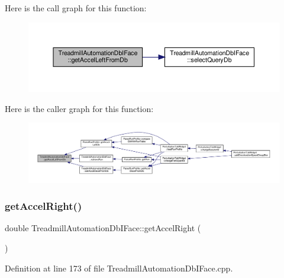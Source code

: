Here is the call graph for this function\+:
\nopagebreak
\begin{figure}[H]
\begin{center}
\leavevmode
\includegraphics[width=350pt]{class_treadmill_automation_db_i_face_a9d028cc3d56ffa0f9a08bcbb1a7a68b7_cgraph}
\end{center}
\end{figure}
Here is the caller graph for this function\+:
\nopagebreak
\begin{figure}[H]
\begin{center}
\leavevmode
\includegraphics[width=350pt]{class_treadmill_automation_db_i_face_a9d028cc3d56ffa0f9a08bcbb1a7a68b7_icgraph}
\end{center}
\end{figure}
\mbox{\label{class_treadmill_automation_db_i_face_ad62daf9b289b6c9fa43ffe5846299408}} 
\subsubsection{\texorpdfstring{get\+Accel\+Right()}{getAccelRight()}}
{\footnotesize\ttfamily double Treadmill\+Automation\+Db\+I\+Face\+::get\+Accel\+Right (\begin{DoxyParamCaption}{ }\end{DoxyParamCaption})}



Definition at line 173 of file Treadmill\+Automation\+Db\+I\+Face.\+cpp.

